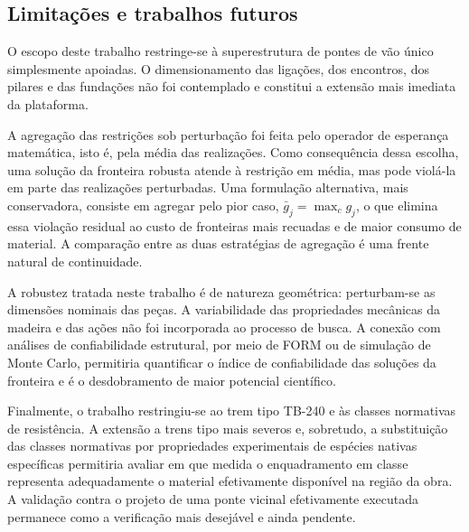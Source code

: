\subsection*{Limitações e trabalhos futuros}

O escopo deste trabalho restringe-se à superestrutura de pontes de vão único simplesmente apoiadas.
O dimensionamento das ligações, dos encontros, dos pilares e das fundações não foi contemplado e constitui a extensão mais imediata da plataforma.

A agregação das restrições sob perturbação foi feita pelo operador de esperança matemática, isto é, pela média das realizações.
Como consequência dessa escolha, uma solução da fronteira robusta atende à restrição em média, mas pode violá-la em parte das realizações perturbadas.
Uma formulação alternativa, mais conservadora, consiste em agregar pelo pior caso, $\bar{g}_j = \max_c g_j$, o que elimina essa violação residual ao custo de fronteiras mais recuadas e de maior consumo de material.
A comparação entre as duas estratégias de agregação é uma frente natural de continuidade.

A robustez tratada neste trabalho é de natureza geométrica: perturbam-se as dimensões nominais das peças.
A variabilidade das propriedades mecânicas da madeira e das ações não foi incorporada ao processo de busca.
A conexão com análises de confiabilidade estrutural, por meio de FORM ou de simulação de Monte Carlo, permitiria quantificar o índice de confiabilidade das soluções da fronteira e é o desdobramento de maior potencial científico.

Finalmente, o trabalho restringiu-se ao trem tipo TB-240 e às classes normativas de resistência.
A extensão a trens tipo mais severos e, sobretudo, a substituição das classes normativas por propriedades experimentais de espécies nativas específicas permitiria avaliar em que medida o enquadramento em classe representa adequadamente o material efetivamente disponível na região da obra.
A validação contra o projeto de uma ponte vicinal efetivamente executada permanece como a verificação mais desejável e ainda pendente.
